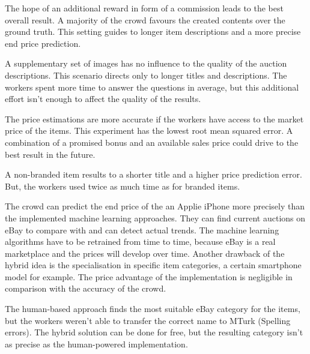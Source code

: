 The hope of an additional reward in form of a commission leads to the best overall result. A majority of the crowd favours the created contents over the ground truth. This setting guides to longer item descriptions and a more precise end price prediction.

A supplementary set of images has no influence to the quality of the auction descriptions. This scenario directs only to longer titles and descriptions. The workers spent more time to answer the questions in average, but this additional effort isn't enough to affect the quality of the results.

The price estimations are more accurate if the workers have access to the market price of the items. This experiment has the lowest root mean squared error. A combination of a promised bonus and an available sales price could drive to the best result in the future.

A non-branded item results to a shorter title and a higher price prediction error. But, the workers used twice as much time as for branded items.

The crowd can predict the end price of the an Applie iPhone more precisely than the implemented machine learning approaches. They can find current auctions on eBay to compare with and can detect actual trends. The machine learning algorithms have to be retrained from time to time, because eBay is a real marketplace and the prices will develop over time. Another drawback of the hybrid idea is the specialisation in specific item categories, a certain smartphone model for example. The price advantage of the implementation is negligible in comparison with the accuracy of the crowd.

The human-based approach finds the most suitable eBay category for the items, but the workers weren't able to transfer the correct name to MTurk (Spelling errors). The hybrid solution can be done for free, but the resulting category isn't as precise as the human-powered implementation.
